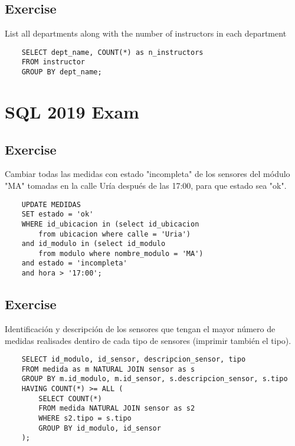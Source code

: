 \documentclass{article}
\begin{document}
\vspace{4mm}
\subsection{Exercise}
\noindent List all departments along with the number of instructors in each
department
\begin{lstlisting}
    SELECT dept_name, COUNT(*) as n_instructors
    FROM instructor
    GROUP BY dept_name;
\end{lstlisting}

\newpage
\section{SQL 2019 Exam}
\subsection{Exercise}
\noindent Cambiar todas las medidas con estado "incompleta" de los sensores del
módulo "MA" tomadas en la calle Uría después de las 17:00, para que estado sea "ok".
\begin{lstlisting}
    UPDATE MEDIDAS
    SET estado = 'ok'
    WHERE id_ubicacion in (select id_ubicacion
        from ubicacion where calle = 'Uria')
    and id_modulo in (select id_modulo
        from modulo where nombre_modulo = 'MA')
    and estado = 'incompleta'
    and hora > '17:00';
\end{lstlisting}

\vspace{4mm}
\subsection{Exercise}
\noindent Identificación y descripción de los sensores que tengan el mayor número de
medidas realisades dentiro de cada tipo de sensores (imprimir también el tipo).
\begin{lstlisting}
    SELECT id_modulo, id_sensor, descripcion_sensor, tipo
    FROM medida as m NATURAL JOIN sensor as s
    GROUP BY m.id_modulo, m.id_sensor, s.descripcion_sensor, s.tipo
    HAVING COUNT(*) >= ALL (
        SELECT COUNT(*)
        FROM medida NATURAL JOIN sensor as s2
        WHERE s2.tipo = s.tipo
        GROUP BY id_modulo, id_sensor
    );
\end{lstlisting}

\vspace{4mm}
\end{document}
